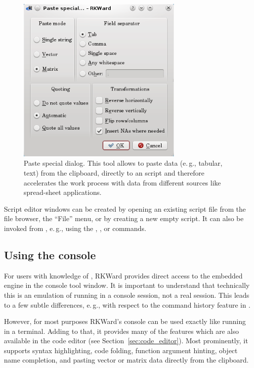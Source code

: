 \begin{figure}[t!]
 \centering
 \includegraphics[width=8.043cm]{../figures/special_paste.png}
 \caption{Paste special dialog. This tool allows to paste data (e.\,g., tabular, text) from the clipboard, directly to an 
  script and therefore accelerates the work process with data from different sources 
 like spread-sheet applications.
}
 \label{fig:special_paste}
\end{figure}

Script editor windows can be created by opening an existing
 script file from the file browser, the
``File'' menu, or by creating a new empty script. It can
also be invoked from , e.\,g., using the
, , or 
commands.

\subsection[Using the R console]{Using the  console}
\label{sec:using_R_console}
For users with knowledge of , RKWard provides direct access to the
embedded  engine in the
 console tool window. It is important to understand that technically this is an
emulation of  running in a console
session, not a real  session. This leads to a few subtle
differences, e.\,g., with respect to the command history feature in
.

However, for most purposes RKWard's  console can be used exactly
like  running in a terminal. Adding to that, it provides many of the
features which are also available in the code editor (see Section~\ref{sec:code_editor}).
Most prominently, it supports syntax highlighting, code
folding, function argument hinting, object name completion, and pasting
vector or matrix data directly from the clipboard.

